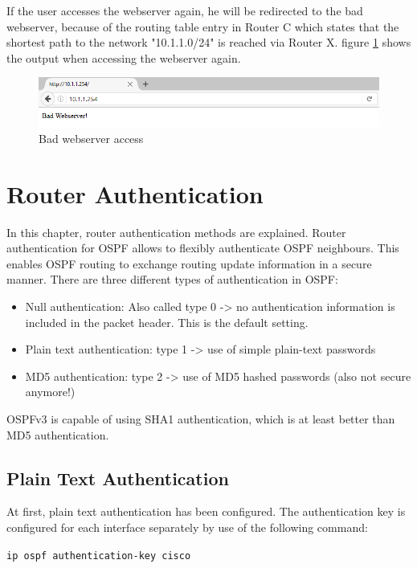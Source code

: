 If the user accesses the webserver again, he will be redirected to the bad webserver, because of the routing table entry in Router C which states that the shortest path to the network "10.1.1.0/24" is reached via Router X.
figure \ref{img:BadWebserverScreenshot} shows the output when accessing the webserver again.

\begin{figure}[H]
	\centering
	\includegraphics[width=1.0\textwidth]{img/BadWebserverScreenshot.png}
	\caption{Bad webserver access}
	\label{img:BadWebserverScreenshot}
\end{figure}

\chapter{Router Authentication}

In this chapter, router authentication methods are explained. Router authentication for \ac{OSPF} allows to flexibly authenticate \ac{OSPF} neighbours. This enables \ac{OSPF} routing to exchange routing update information in a secure manner.
There are three different types of authentication in OSPF:
\begin{itemize}
\item Null authentication: Also called type 0 -> no authentication information is included in the packet header. This is the default setting.
\item Plain text authentication: type 1 -> use of simple plain-text passwords
\item MD5 authentication: type 2 -> use of MD5 hashed passwords (also not secure anymore!)
\end{itemize}

OSPFv3 is capable of using SHA1 authentication, which is at least better than MD5 authentication.

\section{Plain Text Authentication}

At first, plain text authentication has been configured.
The authentication key is configured for each interface separately by use of the following command:

\texttt{ip ospf authentication-key cisco}

